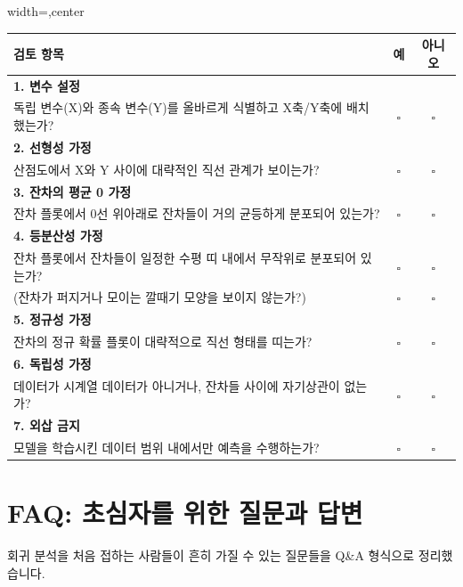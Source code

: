 \documentclass[11pt,a4paper]{article}
\theoremstyle{definition}
\begin{document}
\begin{adjustbox}{width=\textwidth,center}
\begin{tabular}{p{}cc}
\toprule
\textbf{검토 항목} & \textbf{예} & \textbf{아니오} \\
\midrule
\textbf{1. 변수 설정} & & \\
\quad 독립 변수(X)와 종속 변수(Y)를 올바르게 식별하고 X축/Y축에 배치했는가? & $\square$ & $\square$ \\
\textbf{2. 선형성 가정} & & \\
\quad 산점도에서 X와 Y 사이에 대략적인 직선 관계가 보이는가? & $\square$ & $\square$ \\
\textbf{3. 잔차의 평균 0 가정} & & \\
\quad 잔차 플롯에서 0선 위아래로 잔차들이 거의 균등하게 분포되어 있는가? & $\square$ & $\square$ \\
\textbf{4. 등분산성 가정} & & \\
\quad 잔차 플롯에서 잔차들이 일정한 수평 띠 내에서 무작위로 분포되어 있는가? & $\square$ & $\square$ \\
\quad (잔차가 퍼지거나 모이는 깔때기 모양을 보이지 않는가?) & $\square$ & $\square$ \\
\textbf{5. 정규성 가정} & & \\
\quad 잔차의 정규 확률 플롯이 대략적으로 직선 형태를 띠는가? & $\square$ & $\square$ \\
\textbf{6. 독립성 가정} & & \\
\quad 데이터가 시계열 데이터가 아니거나, 잔차들 사이에 자기상관이 없는가? & $\square$ & $\square$ \\
\textbf{7. 외삽 금지} & & \\
\quad 모델을 학습시킨 데이터 범위 내에서만 예측을 수행하는가? & $\square$ & $\square$ \\
\bottomrule
\end{tabular}
\end{adjustbox}

\newpage
\section{FAQ: 초심자를 위한 질문과 답변}
회귀 분석을 처음 접하는 사람들이 흔히 가질 수 있는 질문들을 Q\&A 형식으로 정리했습니다.
\end{document}
